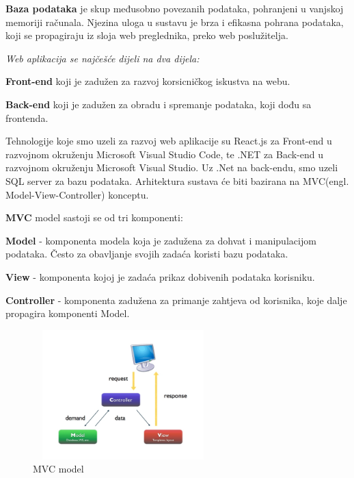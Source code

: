                   \textbf{Baza podataka} je skup međusobno povezanih podataka, pohranjeni u vanjskoj memoriji računala. Njezina uloga u sustavu je brza i efikasna
                                 pohrana podataka, koji se propagiraju iz sloja web preglednika, preko web poslužitelja.

                  \textit{Web aplikacija se najčešće dijeli na dva dijela: }

                               \begin{packed_item}
              			 \item  \textbf{Front-end} koji je zadužen za razvoj korsicničkog iskustva na webu.
                		\item    \textbf{Back-end} koji je zadužen za obradu i spremanje podataka, koji dođu sa frontenda.

              		       \end{packed_item}

                                Tehnologije koje smo uzeli za razvoj web aplikacije su React.js za Front-end u razvojnom okruženju Microsoft Visual Studio Code, te .NET za Back-end u razvojnom okruženju Microsoft Visual Studio.
                                Uz .Net na back-endu, smo uzeli SQL server za bazu podataka. 
                                Arhitektura sustava će biti bazirana na MVC(engl. Model-View-Controller) konceptu.

                      \textbf{MVC} model sastoji se od tri komponenti: 
                                  
                               \begin{packed_item}
             			  \item \textbf{Model} -  komponenta modela koja je zadužena za dohvat i manipulacijom podataka. Često za obavljanje svojih zadaća koristi bazu podataka.
                		  \item  \textbf{View} -   komponenta kojoj je zadaća prikaz dobivenih podataka korisniku.
               		           \item  \textbf{Controller} - komponenta zadužena za primanje zahtjeva od korisnika, koje dalje propagira komponenti Model.

                                \end{packed_item}
                  
                    \begin{figure}[H]
                     \includegraphics[width=7cm, height=5cm ]{./slike/mvc.jpg}
                      \centering
                      \caption{MVC model}
                    \end{figure}
                    
